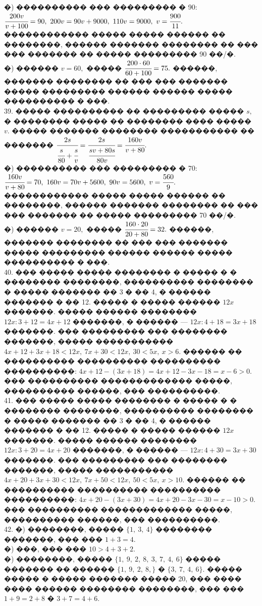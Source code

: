 \documentclass[12pt]{article}
\begin{document}
�) ���������� ��� ��������� � 90: $\cfrac{200v}{v+100}=90,\ 200v=90v+9000,\ 110v=9000,\ v=\cfrac{900}{11}.$ ������������ ����� ����� ������ �� ��������, ������ ������� �������� �� ��� ��� ������� �� ����� ��������� 90 ��/�.\\
�) ������ $v=60,$ ����� $\cfrac{200\cdot60}{60+100}=75.$ ������, ������� �������� �� ��� ��� ������� ����� ��������� ������ ������ ����� ���������� � ���.\\
39. ����� ���������� �� ��������� ����� $s,$ � �������� ����� �� �������� ���� ����� $v.$ ����� ������� �������� ����������� �� ������� $\cfrac{2s}{\cfrac{s}{80}+\cfrac{s}{v}}=\cfrac{2s}{\cfrac{sv+80s}{80v}}=\cfrac{160v}{v+80}.$\\
�) ���������� ��� ��������� � 70: $\cfrac{160v}{v+80}=70,\ 160v=70v+5600,\ 90v=5600,\ v=\cfrac{560}{9}.$ ������������ ����� ����� ������ �� ��������, ������ ������� �������� �� ��� ��� ������� �� ����� ��������� 70 ��/�.\\
�) ������ $v=20,$ ����� $\cfrac{160\cdot20}{20+80}=32.$ ������, ������� �������� �� ��� ��� ������� ����� ��������� ������ ������ ����� ���������� � ���.\\
40. ��� ����� ����� �������� � ����� � � �������� ��������, ���������� �������� � ����� ������� �� 3 � �� 4, � ������ ������� � �� 12. ����� � ����� ������ $12x$ �������. ����� ������ �������� $12x:3+12=4x+12$ �������, � ������ --- $12x:4+18=3x+18$ �������. ��� ��������� ��� �������� �������, ����� ����������� $4x+12+3x+18<12x,\ 7x+30<12x,\ 30<5x,\ x>6.$ ������ �� ���������� ���������� ���������� ����������: $4x+12-(3x+18)=4x+12-3x-18=x-6>0.$ ��� ���������� ������������� �����, ���������� ������, ��� ����������.\\
41. ��� ����� ����� �������� � ����� � � �������� ��������, ���������� �������� � ����� ������� �� 3 � �� 4, � ������ ������� � �� 12. ����� � ����� ������ $12x$ �������. ����� ������ �������� $12x:3+20=4x+20$ �������, � ������ --- $12x:4+30=3x+30$ �������. ��� ��������� ��� �������� �������, ����� ����������� $4x+20+3x+30<12x,\ 7x+50<12x,\ 50<5x,\ x>10.$ ������ �� ���������� ���������� ���������� ����������: $4x+20-(3x+30)=4x+20-3x-30=x-10>0.$ ��� ���������� ������������� �����, ���������� ������, ��� ����������.\\
42. �) ��������, ����� $\{1,\ 3,\ 4\}$ �������� �������, ��� ��� $1+3=4.$\\
�) ���, ��� ��� $10>4+3+2.$\\
�) ��������, ����� $\{1,\ 9,\ 2,\ 8,\ 3,\ 7,\ 4,\ 6\}$ ����� ������� �� ������ $\{1,\ 9,\ 2,\ 8,\}$ � $\{3,\ 7,\ 4,\ 6\}.$ ����� ����� � ����� ������� ����� 20, ��� ���� ���� ������ �������� ��������, ��� ��� $1+9=2+8$ � $3+7=4+6.$\\
\end{document}
